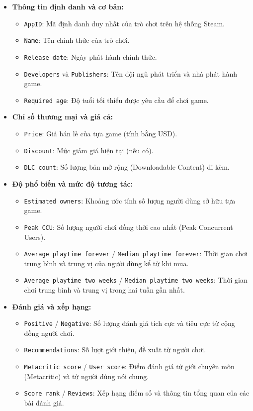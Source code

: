 \begin{itemize}
    \item \textbf{Thông tin định danh và cơ bản:}
    \begin{itemize}
        \item \texttt{AppID}: Mã định danh duy nhất của trò chơi trên hệ thống Steam.
        \item \texttt{Name}: Tên chính thức của trò chơi.
        \item \texttt{Release date}: Ngày phát hành chính thức.
        \item \texttt{Developers} và \texttt{Publishers}: Tên đội ngũ phát triển và nhà phát hành game.
        \item \texttt{Required age}: Độ tuổi tối thiểu được yêu cầu để chơi game.
    \end{itemize}

    \item \textbf{Chỉ số thương mại và giá cả:}
    \begin{itemize}
        \item \texttt{Price}: Giá bán lẻ của tựa game (tính bằng USD).
        \item \texttt{Discount}: Mức giảm giá hiện tại (nếu có).
        \item \texttt{DLC count}: Số lượng bản mở rộng (Downloadable Content) đi kèm.
    \end{itemize}

    \item \textbf{Độ phổ biến và mức độ tương tác:}
    \begin{itemize}
        \item \texttt{Estimated owners}: Khoảng ước tính số lượng người dùng sở hữu tựa game.
        \item \texttt{Peak CCU}: Số lượng người chơi đồng thời cao nhất (Peak Concurrent Users).
        \item \texttt{Average playtime forever} / \texttt{Median playtime forever}: Thời gian chơi trung bình và trung vị của người dùng kể từ khi mua.
        \item \texttt{Average playtime two weeks} / \texttt{Median playtime two weeks}: Thời gian chơi trung bình và trung vị trong hai tuần gần nhất.
    \end{itemize}

    \item \textbf{Đánh giá và xếp hạng:}
    \begin{itemize}
        \item \texttt{Positive} / \texttt{Negative}: Số lượng đánh giá tích cực và tiêu cực từ cộng đồng người chơi.
        \item \texttt{Recommendations}: Số lượt giới thiệu, đề xuất từ người chơi.
        \item \texttt{Metacritic score} / \texttt{User score}: Điểm đánh giá từ giới chuyên môn (Metacritic) và từ người dùng nói chung.
        \item \texttt{Score rank} / \texttt{Reviews}: Xếp hạng điểm số và thông tin tổng quan của các bài đánh giá.
    \end{itemize}


\end{itemize}
